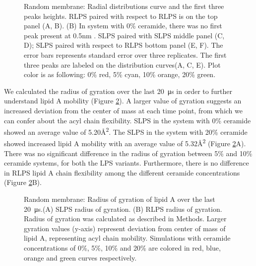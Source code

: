 \documentclass[10pt, letterpaper]{article}
\begin{document}
 
\begin{figure}[H]
  \centering
  \qquad
  \qquad
  \caption[Random Membrane: Radial Distribution Function]{Random membrane: Radial distributions curve and the first three peaks heights. RLPS paired with respect to RLPS is on the top panel (A, B). (B) In system with 0\% ceramide, there was no first peak present at 0.5nm . SLPS paired with SLPS middle panel (C, D); SLPS paired with respect to RLPS bottom panel (E, F). The error bars represents standard error over three replicates. The first three peaks are labeled on the distribution curves(A, C, E). Plot color is as following: 0\% red, 5\% cyan, 10\% orange, 20\% green.}
  \label{fig:rand_radial_dist}
\end{figure}

We calculated the radius of gyration  over the last \SI{20}{\micro\second} in order to further understand lipid A mobility (Figure \ref{fig:ran_rgry}). A larger value of gyration suggests an increased deviation from the center of mass at each time point, from which we can confer about the acyl chain flexibility. SLPS in the system with 0\% ceramide showed an average value of 5.20\si{\angstrom^2}. The SLPS in the system with 20\% ceramide showed increased lipid A mobility with an average value of 5.32\si{\angstrom^2} (Figure \ref{fig:ran_rgry}A). There was no significant difference in the radius of gyration between 5\% and 10\% ceramide systems, for both the LPS variants. Furthermore, there is no difference in RLPS lipid A chain flexibility among the different ceramide concentrations (Figure \ref{fig:ran_rgry}B). 


\begin{figure}[H]
  \centering
  \caption[Random Membrane: Radius of gyration]{Random membrane: Radius of gyration of lipid A over the last \SI{20}{\micro\second}.(A) SLPS radius of gyration. (B) RLPS radius of gyration. Radius of gyration was calculated as described in Methods. Larger gyration values (y-axis) represent deviation from center of mass of lipid A, representing acyl chain mobility. Simulations with ceramide concentrations of 0\%, 5\%, 10\% and 20\% are colored in red, blue, orange and green curves respectively.
  }\label{fig:ran_rgry}
\end{figure}
\end{document}

